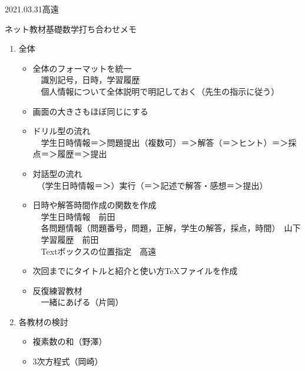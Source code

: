 \documentclass[10pt]{ujarticle}
\begin{document}
\begin{flushright}
2021.03.31高遠　　
\end{flushright}

\begin{center}
{\large ネット教材基礎数学打ち合わせメモ}
\end{center}

\begin{enumerate}[\bf 1.]
\item 全体
\begin{itemize}
\item 全体のフォーマットを統一\\
　識別記号，日時，学習履歴\\
　個人情報について全体説明で明記しておく（先生の指示に従う）

\item 画面の大きさもほぼ同じにする\\

\item ドリル型の流れ\\
　学生日時情報＝＞問題提出（複数可）＝＞解答（＝＞ヒント）＝＞採点＝＞履歴＝＞提出\\
\item 対話型の流れ\\
　（学生日時情報＝＞）実行（＝＞記述で解答・感想＝＞提出）\\

\item 日時や解答時間作成の関数を作成\\
　学生日時情報　前田\\
　各問題情報（問題番号，問題，正解，学生の解答，採点，時間）　山下\\
　学習履歴　前田\\
　Textボックスの位置指定　高遠

 \item 次回までにタイトルと紹介と使い方\TeX ファイルを作成\\

\item 反復練習教材\\
　一緒にあげる（片岡）

\end{itemize}

\item 各教材の検討
\begin{itemize}
\item[]複素数の和（野澤）\\

\item[]3次方程式（岡崎）\\


\end{itemize}
\end{enumerate}
\end{document}
